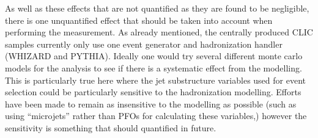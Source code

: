 As well as these effects that are not quantified as they are found to be negligible, there is one unquantified effect that should be taken into account when performing the measurement. As already mentioned, the centrally produced \ac{CLIC} samples currently only use one event generator and hadronization handler (WHIZARD and PYTHIA). Ideally one would try several different monte carlo models for the analysis to see if there is a systematic effect from the modelling. This is particularly true here where the jet substructure variables used for event selection could be particularly sensitive to the hadronization modelling. Efforts have been made to remain as insensitive to the modelling as possible (such as using ``microjets'' rather than PFOs for calculating these variables,) however the sensitivity is something that should quantified in future.

